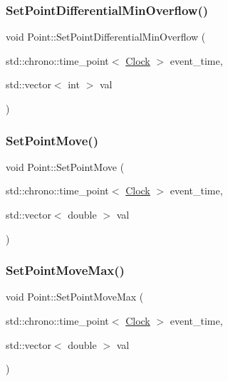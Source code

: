 \subsubsection{\texorpdfstring{Set\+Point\+Differential\+Min\+Overflow()}{SetPointDifferentialMinOverflow()}}
{\footnotesize\ttfamily void Point\+::\+Set\+Point\+Differential\+Min\+Overflow (\begin{DoxyParamCaption}\item[{std\+::chrono\+::time\+\_\+point$<$ \mbox{\hyperlink{universe_8h_a0ef8d951d1ca5ab3cfaf7ab4c7a6fd80}{Clock}} $>$}]{event\+\_\+time,  }\item[{std\+::vector$<$ int $>$}]{val }\end{DoxyParamCaption})\hspace{0.3cm}{\ttfamily [inline]}}

\mbox{\label{classPoint_a2cf44d5cf17ecf2b3385bde963678589}} 
\subsubsection{\texorpdfstring{Set\+Point\+Move()}{SetPointMove()}}
{\footnotesize\ttfamily void Point\+::\+Set\+Point\+Move (\begin{DoxyParamCaption}\item[{std\+::chrono\+::time\+\_\+point$<$ \mbox{\hyperlink{universe_8h_a0ef8d951d1ca5ab3cfaf7ab4c7a6fd80}{Clock}} $>$}]{event\+\_\+time,  }\item[{std\+::vector$<$ double $>$}]{val }\end{DoxyParamCaption})\hspace{0.3cm}{\ttfamily [inline]}}

\mbox{\label{classPoint_afa3c2290a72c99e8892029eaa6676204}} 
\subsubsection{\texorpdfstring{Set\+Point\+Move\+Max()}{SetPointMoveMax()}}
{\footnotesize\ttfamily void Point\+::\+Set\+Point\+Move\+Max (\begin{DoxyParamCaption}\item[{std\+::chrono\+::time\+\_\+point$<$ \mbox{\hyperlink{universe_8h_a0ef8d951d1ca5ab3cfaf7ab4c7a6fd80}{Clock}} $>$}]{event\+\_\+time,  }\item[{std\+::vector$<$ double $>$}]{val }\end{DoxyParamCaption})\hspace{0.3cm}{\ttfamily [inline]}}

